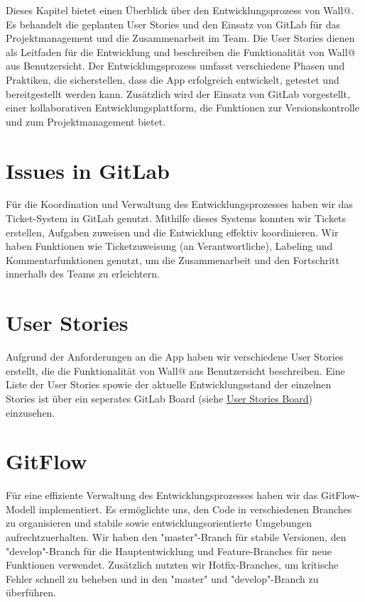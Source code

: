 
Dieses Kapitel bietet einen Überblick über den Entwicklungsprozess von Wall@. 
Es behandelt die geplanten User Stories und den Einsatz von GitLab für das Projektmanagement und die Zusammenarbeit im Team.
Die User Stories dienen als Leitfaden für die Entwicklung und beschreiben die Funktionalität von Wall@ aus Benutzersicht. 
Der Entwicklungsprozess umfasst verschiedene Phasen und Praktiken, die sicherstellen, dass die App erfolgreich entwickelt, getestet und bereitgestellt werden kann.
Zusätzlich wird der Einsatz von GitLab vorgestellt, einer kollaborativen Entwicklungsplattform, die Funktionen zur Versionskontrolle und zum Projektmanagement bietet.

\section{Issues in GitLab}
Für die Koordination und Verwaltung des Entwicklungsprozesses haben wir das Ticket-System in GitLab genutzt. 
Mithilfe dieses Systems konnten wir Tickets erstellen, Aufgaben zuweisen und die Entwicklung effektiv koordinieren. 
Wir haben Funktionen wie Ticketzuweisung (an Verantwortliche), Labeling und Kommentarfunktionen genutzt, 
um die Zusammenarbeit und den Fortschritt innerhalb des Teams zu erleichtern.

\section{User Stories}
Aufgrund der Anforderungen an die App haben wir verschiedene User Stories erstellt, 
die die Funktionalität von Wall@ aus Benutzersicht beschreiben.
Eine Liste der User Stories spowie der aktuelle Entwicklungsstand der einzelnen Stories ist über ein 
seperates GitLab Board (siehe \href{https://gitlab.in.htwg-konstanz.de/mobile-anwendungen-ss23/gruppen/gruppe-4/-/boards/272}{User Stories Board}) einzusehen.

\section{GitFlow}
Für eine effiziente Verwaltung des Entwicklungsprozesses haben wir das GitFlow-Modell implementiert. 
Es ermöglichte uns, den Code in verschiedenen Branches zu organisieren und stabile sowie entwicklungsorientierte Umgebungen aufrechtzuerhalten. 
Wir haben den "master"-Branch für stabile Versionen, den "develop"-Branch für die Hauptentwicklung und Feature-Branches für neue 
Funktionen verwendet. Zusätzlich nutzten wir Hotfix-Branches, um kritische Fehler schnell zu beheben und in den "master" und 
"develop"-Branch zu überführen.

